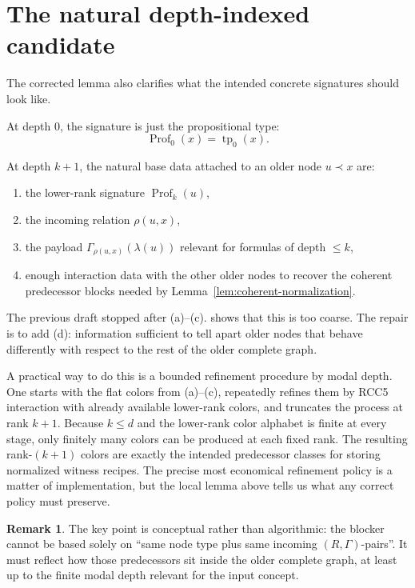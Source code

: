 \documentclass[11pt]{article}
\theoremstyle{definition}
\newtheorem{remark}[theorem]{Remark}
\newcommand{\tp}{\operatorname{tp}}
\newcommand{\Prof}{\operatorname{Prof}}
\begin{document}
\section{The natural depth-indexed candidate}

The corrected lemma also clarifies what the intended concrete signatures should look like.

At depth $0$, the signature is just the propositional type:
\[
\Prof_0(x)=\tp_0(x).
\]

At depth $k+1$, the natural base data attached to an older node $u\prec x$ are:
\begin{enumerate}[label=(\alph*)]
  \item the lower-rank signature $\Prof_k(u)$,
  \item the incoming relation $\rho(u,x)$,
  \item the payload $\Gamma_{\rho(u,x)}(\lambda(u))$ relevant for formulas of depth $\le k$,
  \item enough interaction data with the other older nodes to recover the coherent predecessor blocks needed by Lemma~\ref{lem:coherent-normalization}.
\end{enumerate}

The previous draft stopped after (a)--(c).  shows that this is too coarse. The repair is to add (d): information sufficient to tell apart older nodes that behave differently with respect to the rest of the older complete graph.

A practical way to do this is a bounded refinement procedure by modal depth. One starts with the flat colors from (a)--(c), repeatedly refines them by RCC5 interaction with already available lower-rank colors, and truncates the process at rank $k+1$. Because $k\le d$ and the lower-rank color alphabet is finite at every stage, only finitely many colors can be produced at each fixed rank. The resulting rank-$(k+1)$ colors are exactly the intended predecessor classes for storing normalized witness recipes. The precise most economical refinement policy is a matter of implementation, but the local lemma above tells us what any correct policy must preserve.

\begin{remark}
The key point is conceptual rather than algorithmic: the blocker cannot be based solely on ``same node type plus same incoming $(R,\Gamma)$-pairs''. It must reflect how those predecessors sit inside the older complete graph, at least up to the finite modal depth relevant for the input concept.
\end{remark}
\end{document}
